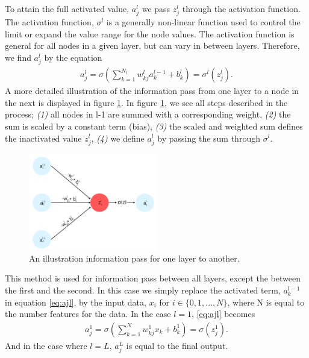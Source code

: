 To attain the full activated value, $a_j^l$ we pass $z_j^l$ through the activation function. The activation function, $\sigma^l$ 
is a generally non-linear function used to control the limit or expand the value range for the node values. The activation 
function is general for all nodes in a given layer, but can vary in between layers. Therefore,
we find $a_j^l$ by the equation
\begin{align}\label{eq:ajl}
    a_j^l = \sigma \left (\sum_{k=1} ^ {N_{l}} w_{kj}^la_k^{l-1} + b^l_k\right ) = \sigma^l(z_j^l).
\end{align}
A more detailed illustration of the information pass from one layer to a node in the next is displayed 
in figure \ref{fig:WB}. In figure \ref{fig:WB}, we see all steps described in the process; \emph{(1)} all nodes in 
l-1 are summed with a corresponding weight, \emph{(2)} the sum is scaled by a constant term (bias), \emph{(3)} the 
scaled and weighted sum defines the inactivated value $z_j^l$, \emph{(4)} we define $a^l_j$ by passing the 
sum through $\sigma^l$.  
\begin{figure}
    \centering
    \includegraphics[width=0.5\textwidth]{Figures/Illustrations/WeightBias.png}
    \caption{An illustration information pass for one layer to another.}
    \label{fig:WB}
\end{figure}
This method is used for information pass between all layers, except the between the first and the second. 
In this case we simply replace the activated term, $a_k^{l-1}$ in equation \ref{eq:ajl}, by the input data,
$x_i$ for $i\in\{0,1,...,N\}$, where N is equal to the number features for the data. In the case $l=1$, \ref{eq:ajl} 
becomes
\begin{align}
    a_j^1 = \sigma \left (\sum_{k=1} ^ {N} w_{kj}^1x_k + b^1_k\right ) = \sigma(z_j^1).
\end{align}
And in the case where $l=L$, $a_j^L$ is equal to the final output. 
